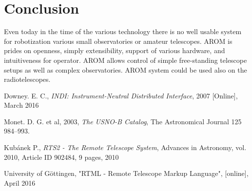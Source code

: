 \documentclass{ibws_template}
\begin{document}
\section{Conclusion}
Even today in the time of the various technology there is no well usable system for robotization various small observatories or amateur telescopes. AROM is prides on openness, simply extensibility, support of various hardware, and intuitiveness for operator. AROM allows control of simple free-standing telescope setups as well as complex observatories. AROM system could be used also on the radiotelescopes.



\begin{thebibliography}{9}

 Downey. E. C., \emph{INDI: Instrument-Neutral Distributed Interface}, 2007 [Online], March 2016

 Monet. D. G. et al, 2003, \emph{The USNO-B Catalog}, The Astronomical Journal 125 984–993.

\bibitem{} Kubánek P., \emph{RTS2 - The Remote Telescope System}, Advances in Astronomy, vol. 2010, Article ID 902484, 9 pages, 2010

\bibitem{}University of Göttingen, "RTML - Remote Telescope Markup Language", [online], April 2016

\end{thebibliography}




\end{document}
